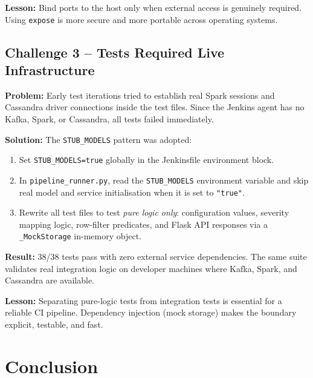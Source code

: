 \documentclass[12pt,a4paper]{report}
\begin{document}
\textbf{Lesson:}  Bind ports to the host only when external access is
genuinely required.  Using \texttt{expose} is more secure and more portable
across operating systems.

\section{Challenge 3 -- Tests Required Live Infrastructure}

\textbf{Problem:}  Early test iterations tried to establish real Spark
sessions and Cassandra driver connections inside the test files.  Since the
Jenkins agent has no Kafka, Spark, or Cassandra, all tests failed immediately.

\textbf{Solution:}  The \texttt{STUB\_MODELS} pattern was adopted:
\begin{enumerate}
  \item Set \texttt{STUB\_MODELS=true} globally in the Jenkinsfile
        environment block.
  \item In \texttt{pipeline\_runner.py}, read the \texttt{STUB\_MODELS}
        environment variable and skip real model and service initialisation
        when it is set to \texttt{"true"}.
  \item Rewrite all test files to test \textit{pure logic only}:
        configuration values, severity mapping logic, row-filter predicates,
        and Flask API responses via a \texttt{\_MockStorage} in-memory object.
\end{enumerate}

\textbf{Result:}  38/38 tests pass with zero external service dependencies.
The same suite validates real integration logic on developer machines where
Kafka, Spark, and Cassandra are available.

\textbf{Lesson:}  Separating pure-logic tests from integration tests is
essential for a reliable CI pipeline.  Dependency injection (mock storage)
makes the boundary explicit, testable, and fast.

\chapter{Conclusion}
\end{document}
